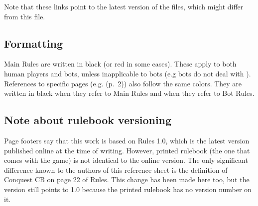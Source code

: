 \documentclass[10pt]{article}
\begin{document}
Note that these links point to the latest version of the files, which might differ from this file.

\subsection*{Formatting}

Main Rules are written in black (or {\color{redTextColor}red} in some cases). These apply to both human players and bots,
unless inapplicable to bots (e.g bots do not deal with \ducats).
References to specific pages (e.g. \dprime(p.~2)\dprime) also follow the same colors.
They are written in black when they refer to Main Rules and 
when they refer to Bot Rules.

\subsection*{Note about rulebook versioning}

Page footers say that this work is based on Rules 1.0, which is the latest version published online at the time of writing. However, printed rulebook (the one that comes with the game) is not identical to the online version. The only significant difference known to the authors of this reference sheet is the definition of Conquest CB on page 22 of Rules. This change has been made here too, but the version still points to 1.0 because the printed rulebook has no version number on it.


\end{document}
